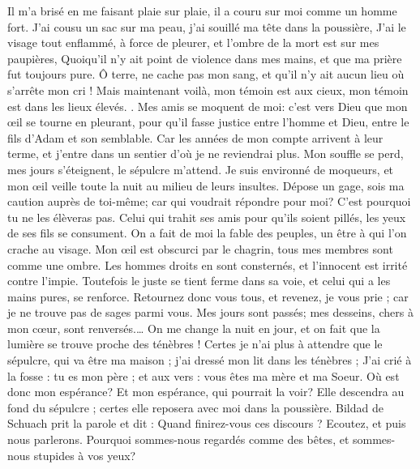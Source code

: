 \begin{multicols}{2}
Il m'a brisé en me faisant plaie sur plaie, il a couru sur moi comme un homme fort.
J'ai cousu un sac sur ma peau, j'ai souillé ma tête dans la poussière,
J'ai le visage tout enflammé, à force de pleurer, et l'ombre de la mort est sur mes paupières, 
Quoiqu'il n'y ait point de violence dans mes mains, et que ma prière fut toujours pure.
Ô terre, ne cache pas mon sang, et qu'il n'y ait aucun lieu où s'arrête mon cri !
Mais maintenant voilà, mon témoin est aux cieux, mon témoin est dans les lieux élevés. .
Mes amis se moquent de moi: c'est vers Dieu que mon œil se tourne en pleurant,
pour qu'il fasse justice entre l'homme et Dieu, entre le fils d'Adam et son semblable.
Car les années de mon compte arrivent à leur terme, et j'entre dans un sentier d'où je ne reviendrai plus. 
\VerseOne{}Mon souffle se perd, mes jours s'éteignent, le sépulcre m'attend.
Je suis environné de moqueurs, et mon œil veille toute la nuit au milieu de leurs insultes.
Dépose un gage, sois ma caution auprès de toi-même; car qui voudrait répondre pour moi? 
C'est pourquoi tu ne les élèveras pas.
Celui qui trahit ses amis pour qu'ils soient pillés, les yeux de ses fils se consument.
On a fait de moi la fable des peuples, un être à qui l'on crache au visage.
Mon œil est obscurci par le chagrin, tous mes membres sont comme une ombre.
Les hommes droits en sont consternés, et l'innocent est irrité contre l'impie. 
Toutefois le juste se tient ferme dans sa voie, et celui qui a les mains pures, se renforce.
Retournez donc vous tous, et revenez, je vous prie ; car je ne trouve pas de sages parmi vous. 
Mes jours sont passés; mes desseins, chers à mon cœur, sont renversés.…
On me change la nuit en jour, et on fait que la lumière se trouve proche des ténèbres !
Certes je n'ai plus à attendre que le sépulcre, qui va être ma maison ; j'ai dressé mon lit dans les ténèbres ;
J'ai crié à la fosse : tu es mon père ; et aux vers : vous êtes ma mère et ma Soeur. 
Où est donc mon espérance? Et mon espérance, qui pourrait la voir? Elle descendra au fond du sépulcre ; certes elle reposera avec moi dans la poussière. 
\VerseOne{}Bildad de Schuach prit la parole et dit :
Quand finirez-vous ces discours ? Ecoutez, et puis nous parlerons.
Pourquoi sommes-nous regardés comme des bêtes, et sommes-nous stupides à vos yeux?

\end{multicols}
